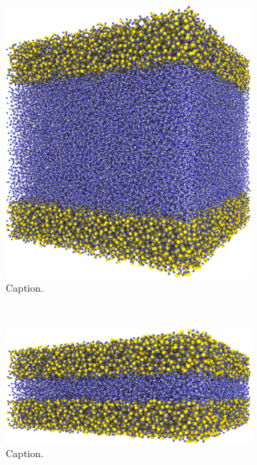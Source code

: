 \begin{figure}[htpb]
\begin{subfigure}[b]{\myfigwidth}
        \includegraphics[width=\textwidth]{images/systems/trimmed-flat_square_fracture03_04}%
        \caption{Caption.}%
    \end{subfigure}%
    \\%
    \begin{subfigure}[b]{\myfigwidth}%
        \centering%
        \includegraphics[width=\textwidth]{images/systems/trimmed-flat_fracture02_03}%
        \caption{Caption.}%
    \end{subfigure}%
    \hfill%
    \begin{subfigure}[b]{\myfigwidth}%

\end{subfigure}
\end{figure}

